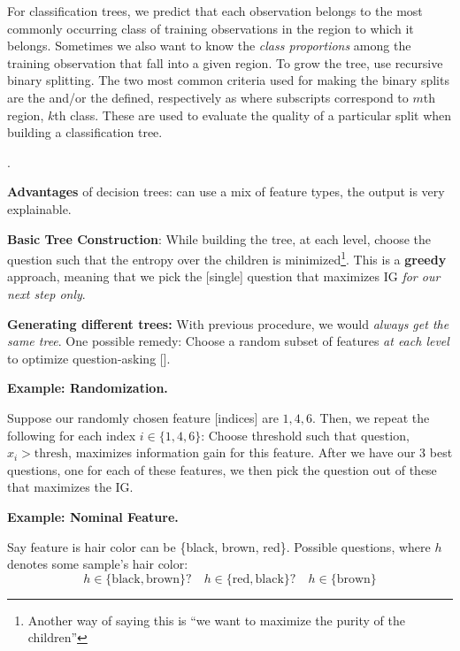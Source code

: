 \documentclass[12pt]{article}
\newcommand\p{\Needspace{10\baselineskip} \noindent}
\begin{document}
\p For classification trees, we predict that each observation belongs to the most commonly occurring class of training observations in the region to which it belongs. Sometimes we also want to know the \textit{class proportions} among the training observation that fall into a given region. To grow the tree, use recursive binary splitting. The two most common criteria used for making the binary splits are the  and/or the  defined, respectively as
where subscripts correspond to $m$th region, $k$th class. These are used to evaluate the quality of a particular split when building a classification tree.




\p {}. 
\begin{compactitem}
	\item \textbf{Advantages} of decision trees: can use a mix of feature types, the output is very explainable. 
	\item \textbf{Basic Tree Construction}: While building the tree, at each level, choose the question such that the  entropy over the children is minimized\footnote{Another way of saying this is ``we want to maximize the purity of the children''}. This is a \textbf{greedy} approach, meaning that we pick the [single] question that maximizes IG \textit{for our next step only}.
	\item \textbf{Generating different trees:} With previous procedure, we would \textit{always get the same tree}. One possible remedy: Choose a random subset of features \textit{at each level} to optimize question-asking []. 
	\begin{compactitem}[$\rightarrow$]
		\item \textbf{Example: Randomization.} \begin{small}Suppose our randomly chosen feature [indices] are $1, 4, 6$. Then, we repeat the following for each index $i \in \{1, 4, 6\}$: Choose threshold such that question, $x_i > \text{thresh}$, maximizes information gain for this feature. After we have our 3 best questions, one for each of these features, we then pick the question out of these that maximizes the IG. \end{small}
		
		\item \textbf{Example: Nominal Feature.} \begin{small}Say feature is hair color can be \{black, brown, red\}. Possible questions, where $h$ denotes some sample's hair color: $$
		h \in \{\text{black}, \text{brown} \} ? \quad h \in \{\text{red}, \text{black} \}? \quad h \in \{\text{brown} \}  
		$$
		\end{small}
	\end{compactitem}
\end{compactitem}
\end{document}
